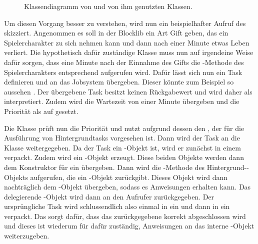 \begin{figure}
	\centering
	
	\caption{Klassendiagramm von  und von ihm genutzten Klassen.}\label{fig:wrapper}
\end{figure}

Um diesen Vorgang besser zu verstehen, wird nun ein beispielhafter Aufruf des  skizziert. Angenommen es soll in der Blocklib ein Art Gift geben, das ein Spielercharakter zu sich nehmen kann und dann nach einer Minute etwas Leben verliert. Die hypothetisch dafür zuständige Klasse muss nun auf irgendeine Weise dafür sorgen, dass eine Minute nach der Einnahme des Gifts die -Methode des Spielercharakters entsprechend aufgerufen wird. Dafür lässt sich nun ein Task definieren und an das Jobsystem übergeben. Dieser könnte zum Beispiel so aussehen . Der übergebene Task besitzt keinen Rückgabewert und wird daher als  interpretiert. Zudem wird die Wartezeit von einer Minute übergeben und die Priorität als auf  gesetzt.

Die Klasse  prüft nun die Priorität und nutzt aufgrund dessen den , der für die Ausführung von Hintergrundtasks vorgesehen ist. Dann wird der Task an die Klasse  weitergegeben. Da der Task ein -Objekt ist, wird er zunächst in einem  verpackt. Zudem wird ein -Objekt erzeugt. Diese beiden Objekte werden dann dem Konstruktor für ein  übergeben. Dann wird die -Methode des Hintergrund--Objekts aufgerufen, die ein -Objekt zurückgibt. Dieses Objekt wird dann nachträglich dem -Objekt übergeben, sodass es Anweisungen erhalten kann. Das delegierende -Objekt wird dann an den Aufrufer zurückgegeben. Der ursprüngliche Task wird schlussendlich also einmal in ein  und dann in ein  verpackt. Das  sorgt dafür, dass das zurückgegebene  korrekt abgeschlossen wird und dieses ist wiederum für dafür zuständig, Anweisungen an das interne -Objekt weiterzugeben.

